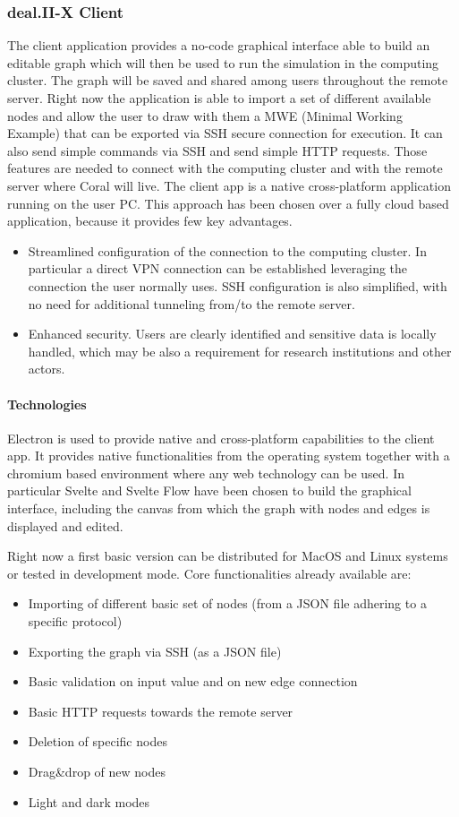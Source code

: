 \documentclass[a4paper,12pt]{article}
\begin{document}
\subsubsection{deal.II-X Client}

The client application provides a no-code graphical interface able to build an editable graph which will then be used to run the simulation in the computing cluster. The graph will be saved and shared among users throughout the remote server. Right now the application is able to import a set of different available nodes and allow the user to draw with them a MWE (Minimal Working Example) that can be exported via SSH secure connection for execution. It can also send simple commands via SSH and send simple HTTP requests. Those features are needed to connect with the computing cluster and with the remote server where Coral will live. The client app is a native cross-platform application running on the user PC. This approach has been chosen over a fully cloud based application, because it provides few key advantages.
\begin{itemize}
  \item Streamlined configuration of the connection to the computing cluster. In particular a direct VPN connection can be established leveraging the connection the user normally uses. SSH configuration is also simplified, with no need for additional tunneling from/to the remote server.
  \item Enhanced security. Users are clearly identified and sensitive data is locally handled, which may be also a requirement for research institutions and other actors.
\end{itemize}

\paragraph{Technologies}
Electron is used to provide native and cross-platform capabilities to the client app. It provides native functionalities from the operating system together with a chromium based environment where any web technology can be used. In particular Svelte and Svelte Flow have been chosen to build the graphical interface, including the canvas from which the graph with nodes and edges is displayed and edited.

Right now a first basic version can be distributed for MacOS and Linux systems or tested in development mode. Core functionalities already available are:
\begin{itemize}
  \item Importing of different basic set of nodes (from a JSON file adhering to a specific protocol)
  \item Exporting the graph via SSH (as a JSON file)
  \item Basic validation on input value and on new edge connection
  \item Basic HTTP requests towards the remote server
  \item Deletion of specific nodes
  \item Drag\&drop of new nodes
  \item Light and dark modes
\end{itemize}
\end{document}
